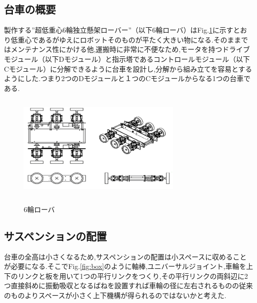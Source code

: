 \documentclass[a4paper]{jarticle}
\begin{document}
\subsection{台車の概要}

製作する”超低重心6輪独立懸架ローバー”（以下6輪ローバ）はFig.\ref{fig:rokurin}に示すとおり低重心であるがゆえにロボットそのものが平たく大きい物になる.そのままではメンテナンス性にかける他,運搬時に非常に不便なため,モータを持つドライブモジュール（以下Dモジュール）と指示塔であるコントロールモジュール（以下Cモジュール）に分解できるように台車を設計し,分解から組み立てを容易とするようにした.つまり2つのDモジュールと１つのCモジュールからなる1つの台車である.

\begin{figure}[htp]
 \begin{center}
  \includegraphics[height=51mm,width=80mm]{img/fig3.png}
 　\caption{6輪ローバ}
  \label{fig:rokurin}%
 \end{center}
\end{figure}

\subsection{サスペンションの配置}

台車の全高は小さくなるため,サスペンションの配置は小スペースに収めることが必要になる.そこでFig.\ref{fig:box}のように軸棒,ユニバーサルジョイント,車輪を上下のリンクと板を用いて1つの平行リンクをつくり,その平行リンクの両斜辺に2つ直接斜めに振動吸収となるばねを設置すれば車輪の径に左右されるものの従来のものよりスペースが小さく上下機構が得られるのではないかと考えた.
\end{document}
